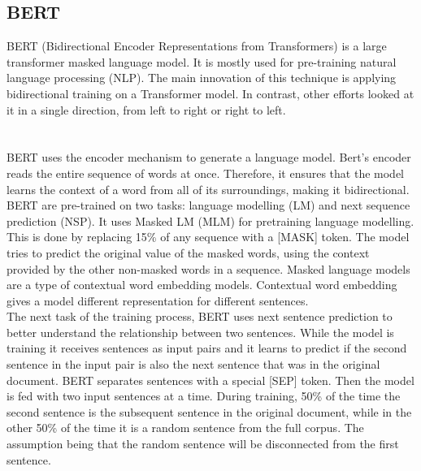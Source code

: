 
\pagebreak

\subsection{BERT}
BERT (Bidirectional Encoder Representations from Transformers) is a large transformer masked language model. It is mostly used for pre-training natural language processing (NLP). The main innovation of this technique is applying bidirectional training on a Transformer model. In contrast, other efforts looked at it in a single direction, from left to right or right to left.\\\\
\pagebreak
\\BERT uses the encoder mechanism to generate a language model. Bert's encoder reads the entire sequence of words at once.  Therefore, it ensures that the model learns the context of a word from all of its surroundings, making it bidirectional. BERT are pre-trained on two tasks: language modelling (LM) and next sequence prediction (NSP). It uses Masked LM (MLM) for pretraining language modelling. This is done by replacing 15\% of any sequence with a [MASK] token. The model tries to predict the original value of the masked words, using the context provided by the other non-masked words in a sequence. Masked language models are a type of contextual word embedding models. Contextual word embedding gives a model different representation for different sentences. 
\\The next task of the training process, BERT uses next sentence prediction to better understand the relationship between two sentences. While the model is training it receives sentences as input pairs and it learns to predict if the second sentence in the input pair is also the next sentence that was in the original document. BERT separates sentences with a special [SEP] token. Then the model is fed with two input sentences at a time. During training, 50\% of the time the second sentence is the subsequent sentence in the original document, while in the other 50\% of the time it is a random sentence from the full corpus. The assumption being that the random sentence will be disconnected from the first sentence.\\\\

